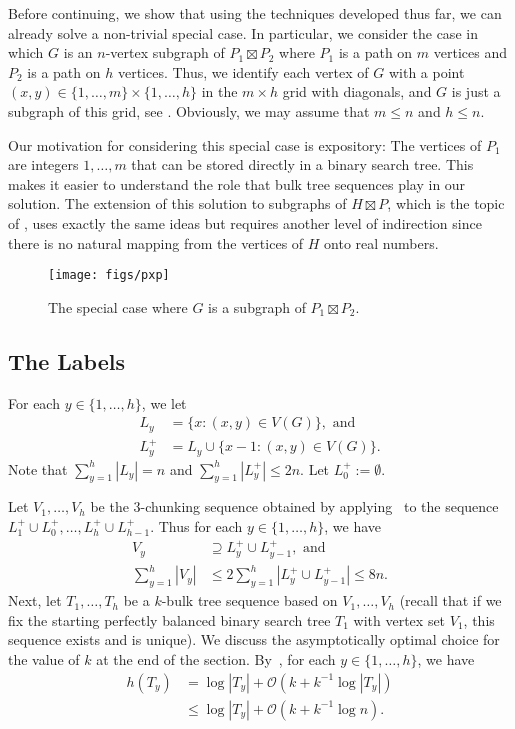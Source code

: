 \documentclass[10pt, conference, compsocconf]{IEEEtran}
\newcommand{\Oh}{\mathcal{O}}
\let\le\leqslant
\let\leq\leqslant
\begin{document}
Before continuing, we show that using the techniques developed thus far, we can already solve a non-trivial special case.  In particular, we consider the case in which $G$ is an $n$-vertex subgraph of $P_1\boxtimes P_2$ where $P_1$ is a path on $m$ vertices and $P_2$ is a path on $h$ vertices.  Thus, we identify each vertex of $G$ with a point $(x,y)\in\{1,\dots,m\}\times \{1,\dots,h\}$ in the $m\times h$ grid with diagonals, and $G$ is just a subgraph of this grid, see .
Obviously, we may assume that $m\leq n$ and $h\leq n$.

Our motivation for considering this special case is expository: The vertices of $P_1$ are integers $1,\dots,m$ that can be stored directly in a binary search tree. This makes it easier to understand the role that bulk tree sequences play in our solution.  The extension of this solution to subgraphs of $H\boxtimes P$, which is the topic of , uses exactly the same ideas but requires another level of indirection since there is no natural mapping from the vertices of $H$ onto real numbers.

\begin{figure}
  \begin{center}
    \texttt{[image: figs/pxp]}
  \end{center}
  \caption{The special case where $G$ is a subgraph of $P_1\boxtimes P_2$.}
\end{figure}


\subsection{The Labels}

For each $y\in\{1,\dots,h\}$, we let
\begin{align*}
L_y&=\{x:(x,y)\in V(G)\}, \textrm{ and}\\
L^+_y&=L_y\cup\{x-1:(x,y)\in V(G)\}.
\end{align*}
Note that $\sum_{y=1}^h |L_y| = n$ and $\sum_{y=1}^h |L^+_y|\le 2n$.
Let $L^+_0 := \emptyset$.

Let $V_1,\dots,V_{h}$ be the $3$-chunking sequence obtained by applying~ to the sequence $L^+_{1}\cup L^+_{0}, \dots, L^+_{h}\cup L^+_{h-1}$. Thus for each $y\in\{1,\dots,h\}$, we have
\begin{align*}
V_y&\supseteq L^+_{y}\cup L^+_{y-1}, \textrm{ and}\\
\textstyle\sum_{y=1}^h |V_y|&\le 2\textstyle\sum_{y=1}^h |L^+_{y}\cup L^+_{y-1}|\leq 8n.
\end{align*}
Next, let $T_1,\dots,T_h$ be a $k$-bulk tree sequence based on $V_1,\dots,V_{h}$ (recall that if we fix the starting perfectly balanced binary search tree $T_1$ with vertex set $V_1$, this sequence exists and is unique).
We discuss the asymptotically optimal choice for the value of $k$ at the end of the section.
By~, for each $y\in\{1,\dots,h\}$, we have
\begin{align*}
h(T_y)&=\log|T_y| + \Oh(k+k^{-1}\log |T_y|)\\
&\leq\log|T_y| + \Oh(k+k^{-1}\log n).
\end{align*}
\end{document}
